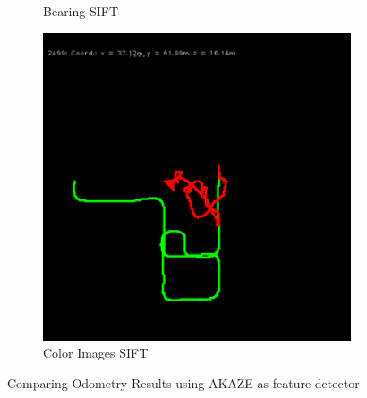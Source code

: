 \begin{figure}[H]
\begin{subfigure}[c]{0.31\linewidth}
    \caption{Bearing SIFT}
\end{subfigure}%
\begin{subfigure}[c]{0.31\linewidth}
    \includegraphics[width=\linewidth]{chapter06/odo/zhang_pinhole_SIFT.png}%
    \caption{Color Images SIFT}
\end{subfigure}
\caption{Comparing Odometry Results using AKAZE as feature detector}
\end{figure}

